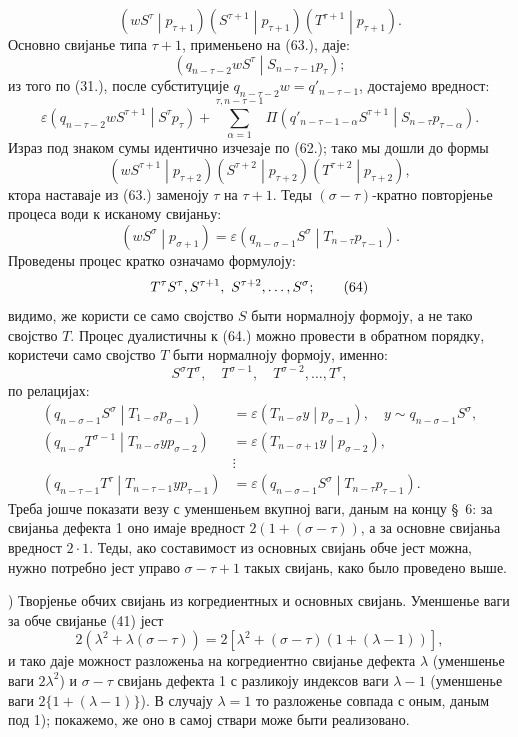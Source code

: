 ﻿\documentclass[11pt]{article}
\newcommand{\pair}[2]{\left(#1\middle|#2\right)}
\newcommand{\eps}{\varepsilon}
\begin{document}
\begin{equation}
 \pair{wS^\tau}{p_{\tau+1}}\pair{S^{\tau+1}}{p_{\tau+1}}\pair{T^{\tau+1}}{p_{\tau+1}}.
\tag{63}
\end{equation}
Основно свијанье типа $\tau+1$, применьено на (63.), даје:
\[
 \pair{q_{n-\tau-2}wS^\tau}{S_{n-\tau-1}p_\tau};
\]
из того по (31.), после субституције $q_{n-\tau-2}w=q'_{n-\tau-1}$, достајемо вредност:
\[
 \eps\pair{q_{n-\tau-2}wS^{\tau+1}}{S^\tau p_\tau}
 +\sum_{\alpha=1}^{\tau,n-\tau-1}\Pi\pair{q'_{n-\tau-1-\alpha}S^{\tau+1}}{S_{n-\tau}p_{\tau-\alpha}}.
\]
Израз под знаком сумы идентично изчезаје по (62.); тако мы дошли до формы
\[
 \pair{wS^{\tau+1}}{p_{\tau+2}}\pair{S^{\tau+2}}{p_{\tau+2}}\pair{T^{\tau+2}}{p_{\tau+2}},
\]
ктора наставаје из (63.) заменоју $\tau$ на $\tau+1$. Теды $(\sigma-\tau)$-кратно повторјенье процеса води к исканому свијаньу:
\[
 \pair{wS^\sigma}{p_{\sigma+1}}=\eps\pair{q_{n-\sigma-1}S^\sigma}{T_{n-\tau}p_{\tau-1}}.
\]
Проведены процес кратко означамо формулоју:
\begin{equation}
 T^\tau S^\tau,\\ S^{\tau+1},\ S^{\tau+2},\ldots,S^\sigma;
\tag{64}
\end{equation}
видимо, же користи се само својство $S$ быти нормалноју формоју, а не тако својство $T$. Процес дуалистичны к (64.) можно провести в обратном порядку, користечи само својство $T$ быти нормалноју формоју, именно:
\begin{equation}
 S^\sigma T^\sigma,
\quad T^{\sigma-1},\quad T^{\sigma-2},\ldots,T^\tau,
\tag{65}
\end{equation}
по релацијах:
\begin{align*}
\pair{q_{n-\sigma-1}S^\sigma}{T_{1-\sigma}p_{\sigma-1}}&=\eps\pair{T_{n-\sigma}y}{p_{\sigma-1}},\quad y\sim q_{n-\sigma-1}S^\sigma,\\
\pair{q_{n-\sigma}T^{\sigma-1}}{T_{n-\sigma}yp_{\sigma-2}}&=\eps\pair{T_{n-\sigma+1}y}{p_{\sigma-2}},\\
&\vdots\\
\pair{q_{n-\tau-1}T^\tau}{T_{n-\tau-1}yp_{\tau-1}}&=\eps\pair{q_{n-\sigma-1}S^\sigma}{T_{n-\tau}p_{\tau-1}}.
\end{align*}
Треба јошче показати везу с уменшеньем вкупној ваги, даным на концу \S\ 6: за свијаньа дефекта 1 оно имаје вредност $2(1+(\sigma-\tau))$, а за основне свијаньа вредност $2\cdot1$. Теды, ако составимост из основных свијань обче јест можна, нужно потребно јест управо $\sigma-\tau+1$ такых свијань, како было проведено выше.

) Творјенье обчих свијань из когредиентных и основных свијань. Уменшенье ваги за обче свијанье (41) јест
\[
2(\lambda^2+\lambda(\sigma-\tau))
=2[\lambda^2+(\sigma-\tau)(1+(\lambda-1))],
\]
и тако даје можност разложеньа на когредиентно свијанье дефекта $\lambda$ (уменшенье ваги $2\lambda^2$) и $\sigma-\tau$ свијань дефекта 1 с разликоју индексов ваги $\lambda-1$ (уменшенье ваги $2\{1+(\lambda-1)\}$). В случају $\lambda=1$ то разложенье совпада с оным, даным под 1); покажемо, же оно в самој ствари може быти реализовано.
\end{document}
